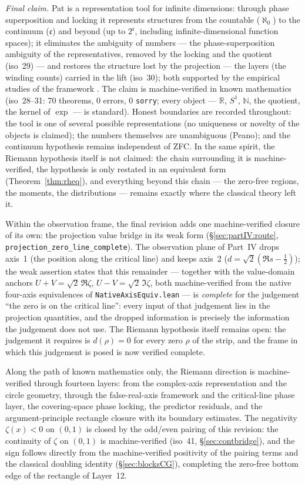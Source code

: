 \documentclass{article}
\newcommand{\zt}{\zeta}
\begin{document}
\emph{Final claim.} Pat is a representation tool for infinite
dimensions: through phase superposition and locking it represents
structures from the countable ($\aleph_0$) to the continuum
($\mathfrak c$) and beyond (up to $2^{\mathfrak c}$, including
infinite-dimensional function spaces); it eliminates the ambiguity of
numbers --- the phase-superposition ambiguity of the representatives,
removed by the locking and the quotient (iso~29) --- and restores the
structure lost by the projection --- the layers (the winding counts)
carried in the lift (iso~30); both supported by the empirical studies
of the framework \cite{patbase}. The claim is machine-verified
in known mathematics (iso~28--31: 70 theorems, 0 errors, 0
\texttt{sorry}; every object --- $\mathbb R$, $S^1$, $\mathbb N$, the
quotient, the kernel of $\exp$ --- is standard). Honest boundaries are
recorded throughout: the tool is one of several possible
representations (no uniqueness or novelty of the objects is claimed);
the numbers themselves are unambiguous (Peano); and the continuum
hypothesis remains independent of ZFC. In the same spirit, the Riemann
hypothesis itself is not claimed: the chain surrounding it is
machine-verified, the hypothesis is only restated in an equivalent
form (Theorem~\ref{thm:rheq}), and everything beyond this chain ---
the zero-free regions, the moments, the distributions --- remains
exactly where the classical theory left it.

Within the observation frame, the final revision adds one machine-verified
closure of its own: the projection value bridge in its weak form
(\S\ref{sec:partIV:route}, \texttt{projection\_zero\_line\_complete}).
The observation plane of Part~IV drops axis~1 (the position along the
critical line) and keeps axis~2 ($d=\sqrt2(\Re s-\tfrac12)$); the weak
assertion states that this remainder --- together with the value-domain
anchors $U+V=\sqrt2\,\Re\zt$, $U-V=\sqrt2\,\Im\zt$, both machine-verified
from the native four-axis equivalences of
\texttt{NativeAxisEquiv.lean} --- is \emph{complete} for the judgement
``the zero is on the critical line'': every input of that judgement
lies in the projection quantities, and the dropped information is
precisely the information the judgement does not use. The Riemann
hypothesis itself remains open: the judgement it requires is
$d(\rho)=0$ for every zero $\rho$ of the strip, and the frame in which
this judgement is posed is now verified complete.

Along the path of known mathematics only, the Riemann direction is
machine-verified through fourteen layers: from the complex-axis representation
and the circle geometry, through the false-real-axis framework and the
critical-line phase layer, the covering-space phase locking, the predictor
residuals, and the argument-principle rectangle closure with its boundary
estimates. The negativity $\zt(x)<0$ on $(0,1)$ is closed by the odd/even
pairing of this revision: the continuity of $\zt$ on $(0,1)$ is
machine-verified (iso~41, \S\ref{sec:contbridge}), and the sign follows
directly from the machine-verified positivity of the pairing terms and the
classical doubling identity (\S\ref{sec:blocksCG}), completing the
zero-free bottom edge of the rectangle of Layer~12.
\end{document}
